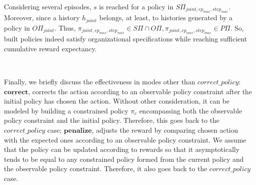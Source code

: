 \begin{proofoutline}
    Considering several episodes, $s$ is reached for a policy in $\allowbreak S\Pi_{joint,ep_{max},step_{max}}$. Moreover, since a history $h_{joint}$ belongs, at least, to histories generated by a policy in $O\Pi_{joint}$. Thus, $\pi_{joint,ep_{max},step_{max}} \in S\Pi \cap O\Pi, \pi_{joint,ep_{max},step_{max}} \in P\Pi$. So, built policies indeed satisfy organizational specifications while reaching sufficient cumulative reward expectancy.

    \

    \noindent Finally, we briefly discuss the effectiveness in modes other than $correct\_policy$:
    $\mathbf{correct}$, corrects the action according to an observable policy constraint after the initial policy has chosen the action. Without other consideration, it can be modeled by building a constrained policy $\pi_c$ encompassing both the observable policy constraint and the initial policy. Therefore, this goes back to the $correct\_policy$ case;
    $\mathbf{penalize}$, adjusts the reward by comparing chosen action with the expected ones according to an observable policy constraint. We assume that the policy can be updated according to rewards so that it asymptotically tends to be equal to any constrained policy formed from the current policy and the observable policy constraint. Therefore, it also goes back to the $correct\_policy$ case.

\end{proofoutline}